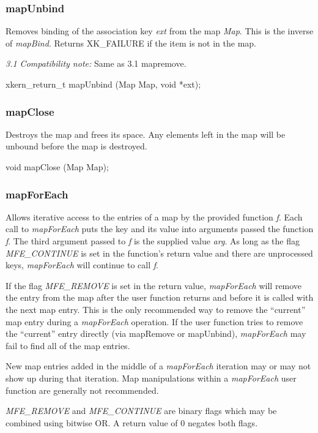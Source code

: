 \subsubsection{mapUnbind}

Removes binding of the association key {\em ext} from the map {\em
Map}.  This is the inverse of {\em mapBind}.  
Returns XK\_FAILURE if the item is not in the map.
\medskip

{\em 3.1 Compatibility note:}  Same as 3.1 mapremove.
\medskip

{\sem xkern\_return\_t} {\bold mapUnbind} ({\sem Map} {\caps Map},  {\sem void } *{\caps ext});

\subsubsection{mapClose}

Destroys the map and frees its space.  Any elements left in the
map will be unbound before the map is destroyed.
\medskip

{\sem void} {\bold mapClose} ({\sem Map} {\caps Map});

\subsubsection{mapForEach}

Allows iterative access to the entries of a map by the provided
function {\em f}.  Each call to {\em mapForEach} puts the key and its
value into arguments passed the function {\em f}.  The third argument
passed to {\em f} is the supplied value {\em arg}.  As long as the
flag {\em MFE\_CONTINUE} is set in the function's return value
and there are unprocessed keys, {\em mapForEach}
will continue to call {\em f}.

If the flag {\em MFE\_REMOVE} is set in the return value, {\em mapForEach}
will remove the entry from the map after the user function returns and
before it is called with the next map entry.  This is the only
recommended way to remove the ``current'' map entry during a
{\em mapForEach} operation.  If the user function tries to remove the
``current'' entry directly (via mapRemove or mapUnbind), {\em mapForEach}
may fail to find all of the map entries.

New map entries added in the middle of a {\em mapForEach} iteration may or
may not show up during that iteration.  Map manipulations within a
{\em mapForEach} user function are generally not recommended.

{\em MFE\_REMOVE} and {\em MFE\_CONTINUE} are binary flags which may
be combined using bitwise OR.  A return value of 0 negates both flags.

